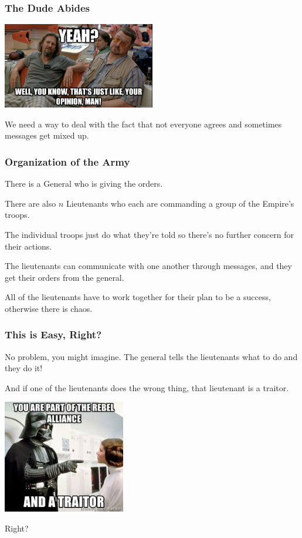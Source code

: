\begin{frame}
\frametitle{The Dude Abides}
\begin{center}
	\includegraphics[width=0.5\textwidth]{images/opinion.jpg}
\end{center}

We need a way to deal with the fact that not everyone agrees and sometimes messages get mixed up.

\end{frame}

\begin{frame}
\frametitle{Organization of the Army}

There is a \alert{General} who is giving the orders. 

There are also $n$ \alert{Lieutenants} who each are commanding a group of the Empire's troops. 

The individual troops just do what they're told so there's no further concern for their actions. 

The lieutenants can communicate with one another through messages, and they get their orders from the general. 

All of the lieutenants have to work together for their plan to be a success, otherwise there is chaos.
\end{frame}


\begin{frame}
\frametitle{This is Easy, Right?}

No problem, you might imagine. The general tells the lieutenants what to do and they do it! 

And if one of the lieutenants does the wrong thing, that lieutenant is a traitor. 

\begin{center}
	\includegraphics[width=0.4\textwidth]{images/vader-traitor.jpeg}
\end{center}

Right?
\end{frame}

